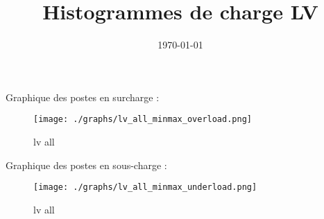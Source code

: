 \documentclass{article}
\title{Histogrammes de charge LV}
\date{\today}
\begin{document}
\maketitle

Graphique des postes en surcharge :
\begin{figure}
    \begin{center}
        \texttt{[image: ./graphs/lv\_all\_minmax\_overload.png]}
    \end{center}
    \caption{lv all}
\end{figure}

Graphique des postes en sous-charge :
\begin{figure}
    \begin{center}
        \texttt{[image: ./graphs/lv\_all\_minmax\_underload.png]}
    \end{center}
    \caption{lv all}
\end{figure}
\end{document}
